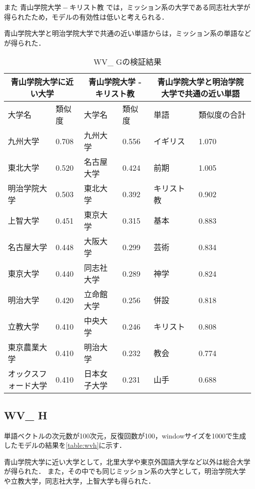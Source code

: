 また $ 青山学院大学 - キリスト教 $ では，ミッション系の大学である同志社大学が得られたため，モデルの有効性は低いと考えられる．

青山学院大学と明治学院大学で共通の近い単語からは，ミッション系の単語などが得られた．
\begin{table}[H]
\caption{WV\_ Gの検証結果}
\centering
\footnotesize
\begin{tabular}{ll|ll|ll}
\hline
\multicolumn{2}{c}{青山学院大学に近い大学} & \multicolumn{2}{c}{青山学院大学 - キリスト教} & \multicolumn{2}{c}{青山学院大学と明治学院大学で共通の近い単語}
\\ \hline
大学名 & 類似度 & 大学名 & 類似度 & 単語 & 類似度の合計
\\ \hline \hline
九州大学 & 0.708 & 九州大学 & 0.556 & イギリス & 1.070\\
東北大学 & 0.520 & 名古屋大学 & 0.424 & 前期 & 1.005\\
明治学院大学 & 0.503 & 東北大学 & 0.392 & キリスト教 & 0.902\\
上智大学 & 0.451 & 東京大学 & 0.315 & 基本 & 0.883\\
名古屋大学 & 0.448 & 大阪大学 & 0.299 & 芸術 & 0.834\\
東京大学 & 0.440 & 同志社大学 & 0.289 & 神学 & 0.824\\
明治大学 & 0.420 & 立命館大学 & 0.256 & 併設 & 0.818\\
立教大学 & 0.410 & 中央大学 & 0.246 & キリスト & 0.808\\
東京農業大学 & 0.410 & 明治大学 & 0.232 & 教会 & 0.774\\
オックスフォード大学 & 0.410 & 日本女子大学 & 0.231 & 山手 & 0.688\\ \hline
\end{tabular}
\label{table:wvg}
\end{table}


\subsection{WV\_ H}
単語ベクトルの次元数が100次元，反復回数が100，windowサイズを1000で生成したモデルの結果を\ref{table:wvh}に示す．

青山学院大学に近い大学として，北里大学や東京外国語大学など以外は総合大学が得られた．
また，その中でも同じミッション系の大学として，明治学院大学や立教大学，同志社大学，上智大学も得られた．

